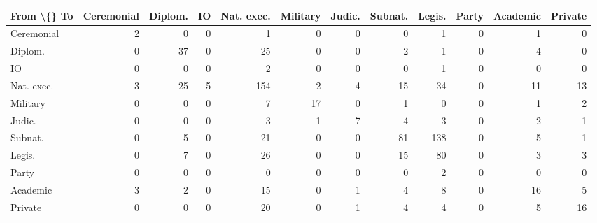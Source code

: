 \begin{tabular}{lrrrrrrrrrrr}
\toprule
From \textbackslash\{\} To & Ceremonial & Diplom. & IO & Nat. exec. & Military & Judic. & Subnat. & Legis. & Party & Academic & Private \\
\midrule
Ceremonial & 2 & 0 & 0 & 1 & 0 & 0 & 0 & 1 & 0 & 1 & 0 \\
Diplom. & 0 & 37 & 0 & 25 & 0 & 0 & 2 & 1 & 0 & 4 & 0 \\
IO & 0 & 0 & 0 & 2 & 0 & 0 & 0 & 1 & 0 & 0 & 0 \\
Nat. exec. & 3 & 25 & 5 & 154 & 2 & 4 & 15 & 34 & 0 & 11 & 13 \\
Military & 0 & 0 & 0 & 7 & 17 & 0 & 1 & 0 & 0 & 1 & 2 \\
Judic. & 0 & 0 & 0 & 3 & 1 & 7 & 4 & 3 & 0 & 2 & 1 \\
Subnat. & 0 & 5 & 0 & 21 & 0 & 0 & 81 & 138 & 0 & 5 & 1 \\
Legis. & 0 & 7 & 0 & 26 & 0 & 0 & 15 & 80 & 0 & 3 & 3 \\
Party & 0 & 0 & 0 & 0 & 0 & 0 & 0 & 2 & 0 & 0 & 0 \\
Academic & 3 & 2 & 0 & 15 & 0 & 1 & 4 & 8 & 0 & 16 & 5 \\
Private & 0 & 0 & 0 & 20 & 0 & 1 & 4 & 4 & 0 & 5 & 16 \\
\bottomrule
\end{tabular}
\par{}

